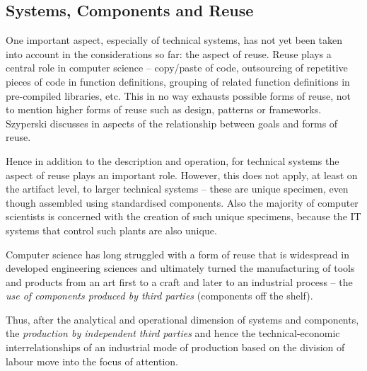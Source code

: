 \documentclass[11pt,a4paper]{article}
\begin{document}
\subsection{Systems, Components and Reuse}

One important aspect, especially of technical systems, has not yet been taken
into account in the considerations so far: the aspect of reuse. Reuse plays a
central role in computer science -- copy/paste of code, outsourcing of
repetitive pieces of code in function definitions, grouping of related
function definitions in pre-compiled libraries, etc. This in no way exhausts
possible forms of reuse, not to mention higher forms of reuse such as design,
patterns or frameworks. Szyperski discusses in \cite[ch. 8]{Szyperski2002}
aspects of the relationship between goals and forms of reuse.

Hence in addition to the description and operation, for technical systems the
aspect of reuse plays an important role. However, this does not apply, at
least on the artifact level, to larger technical systems – these are unique
specimen, even though assembled using standardised components. Also the
majority of computer scientists is concerned with the creation of such unique
specimens, because the IT systems that control such plants are also unique.

Computer science has long struggled with a form of reuse that is widespread in
developed engineering sciences and ultimately turned the manufacturing of
tools and products from an art first to a craft and later to an industrial
process -- the \emph{use of components produced by third parties} (components
off the shelf).

Thus, after the analytical and operational dimension of systems and
components, the \emph{production by independent third parties} and hence the
technical-economic interrelationships of an industrial mode of production
based on the division of labour move into the focus of attention.
\end{document}
